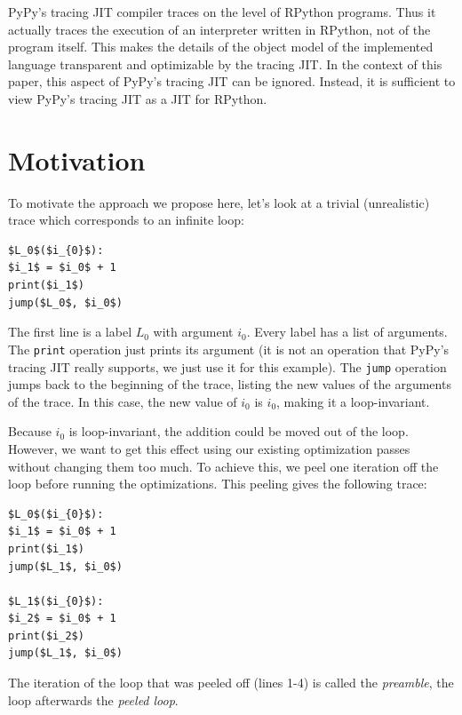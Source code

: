 \documentclass[preprint]{sigplanconf}
\begin{document}
PyPy's tracing JIT compiler traces on the level of RPython programs. Thus it
actually traces the execution of an interpreter written in RPython, not of the
program itself. This makes the details of the object model of the implemented
language transparent and optimizable by the tracing JIT. In the context of this
paper, this aspect of PyPy's tracing JIT can be ignored. Instead, it is
sufficient to view PyPy's tracing JIT as a JIT for RPython.



\section{Motivation}
\label{sec:Motivation}

To motivate the approach we propose here, let's look at a trivial (unrealistic)
trace which corresponds to an infinite loop:

\begin{lstlisting}[mathescape,numbers = right,basicstyle=\setstretch{1.05}\ttfamily\scriptsize]
$L_0$($i_{0}$):
$i_1$ = $i_0$ + 1
print($i_1$)
jump($L_0$, $i_0$)
\end{lstlisting}

The first line is a label $L_0$ with argument $i_0$. Every label has a list of
arguments. The \lstinline{print} operation just prints its argument (it is not
an operation that PyPy's tracing JIT really supports, we just use it for this
example). The \lstinline{jump} operation jumps back to the beginning of the
trace, listing the new values of the arguments of the trace. In this case, the
new value of $i_0$ is $i_0$, making it a loop-invariant.

Because $i_0$ is loop-invariant, the addition could be moved out of the loop.
However, we want to get this effect using our existing optimization passes
without changing them too much. To achieve this, we peel one iteration off the
loop before running the optimizations. This peeling gives the following trace:

\begin{lstlisting}[mathescape,numbers = right,basicstyle=\setstretch{1.05}\ttfamily\scriptsize]
$L_0$($i_{0}$):
$i_1$ = $i_0$ + 1
print($i_1$)
jump($L_1$, $i_0$)

$L_1$($i_{0}$):
$i_2$ = $i_0$ + 1
print($i_2$)
jump($L_1$, $i_0$)
\end{lstlisting}

The iteration of the loop that was peeled off (lines 1-4) is called the
\emph{preamble}, the loop afterwards the \emph{peeled loop}.
\end{document}
